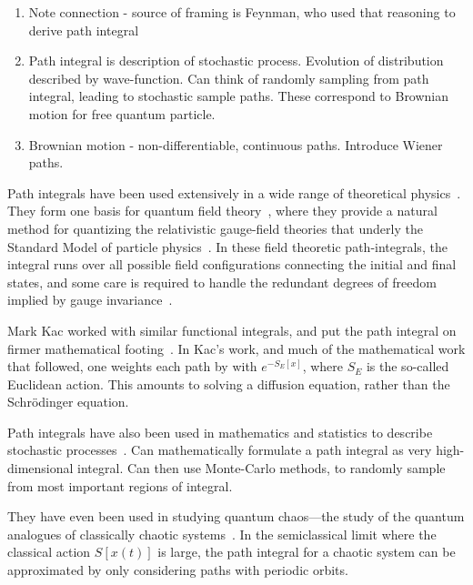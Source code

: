     \begin{enumerate}
      \item Note connection - source of framing is Feynman, who used that reasoning to derive path
        integral
      \item Path integral is description of stochastic process.  Evolution of distribution described
        by wave-function.  Can think of randomly sampling from path integral, leading to stochastic 
        sample paths.  These correspond to Brownian motion for free quantum particle.  
      \item Brownian motion - non-differentiable, continuous paths.  Introduce Wiener paths.  
    \end{enumerate}
    
    Path integrals have been used extensively in a wide range of theoretical physics~\cite{Kleinert2012}.
    They form one basis for quantum field theory~\cite{Brown1994}, where they provide a 
    natural method for quantizing the relativistic gauge-field theories 
    that underly the Standard Model of particle physics~\cite{Srednicki2008}.
    In these field theoretic path-integrals, the integral runs over
    all possible field configurations connecting the initial and final states, and some care is required
    to handle the redundant degrees of freedom implied by gauge invariance~\cite{Fadeev1991}.

    Mark Kac worked with similar functional integrals, and put the path integral 
    on firmer mathematical footing~\cite{Kac1949}.  In Kac's work, and much of the mathematical
    work that followed, one weights each path
    by with $e^{-S_E[x]}$, where $S_E$ is the so-called Euclidean action.  
    This amounts to solving a diffusion equation, rather than the Schr\"odinger equation.  

    Path integrals have also been used in mathematics and statistics to describe stochastic 
    processes~\cite{Durrett1996, Karatzas1991}.  
    Can mathematically formulate a path integral as very high-dimensional integral.
    Can then use Monte-Carlo methods, to randomly sample from most important regions of integral.  

    They have even been used in studying quantum chaos---the study of the quantum analogues 
    of classically chaotic systems~\cite{Gutzwiller1990}.  In the semiclassical limit
    where the classical action $S[x(t)]$ is large, the path integral for a chaotic system
    can be approximated by only considering paths with periodic orbits.  

